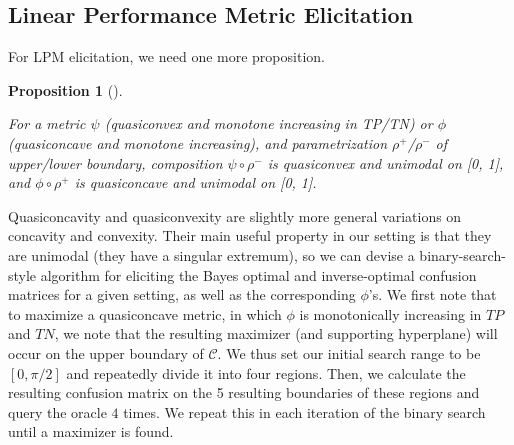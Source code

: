 \documentclass[
  letterpaper,
  numbers=noenddot,
  DIV=11]{scrreprt}
\theoremstyle{plain}
\newtheorem{proposition}{Proposition}[chapter]
\theoremstyle{definition}
\theoremstyle{remark}
\begin{document}
\subsection{Linear Performance Metric Elicitation}\label{sec-orgb6dac4e}

For LPM elicitation, we need one more proposition.

\begin{tcolorbox}[colframe=.grey, title=\faPenSquare \enspace Proposition]

\begin{proposition}[]\protect\hypertarget{prp-prp3.2}{}\label{prp-prp3.2}

For a metric \(\psi\) (quasiconvex and monotone increasing in TP/TN) or
\(\phi\) (quasiconcave and monotone increasing), and parametrization
\(\rho^+\)/\(\rho^-\) of upper/lower boundary, composition
\(\psi \circ \rho^-\) is quasiconvex and unimodal on {[}0, 1{]}, and
\(\phi \circ \rho^+\) is quasiconcave and unimodal on {[}0, 1{]}.

\end{proposition}

\end{tcolorbox}

Quasiconcavity and quasiconvexity are slightly more general variations
on concavity and convexity. Their main useful property in our setting is
that they are unimodal (they have a singular extremum), so we can devise
a binary-search-style algorithm for eliciting the Bayes optimal and
inverse-optimal confusion matrices for a given setting, as well as the
corresponding \(\phi\)'s. We first note that to maximize a quasiconcave
metric, in which \(\phi\) is monotonically increasing in \(TP\) and
\(TN\), we note that the resulting maximizer (and supporting hyperplane)
will occur on the upper boundary of \(\mathcal{C}\). We thus set our
initial search range to be \([0, \pi/2]\) and repeatedly divide it into
four regions. Then, we calculate the resulting confusion matrix on the 5
resulting boundaries of these regions and query the oracle \(4\) times.
We repeat this in each iteration of the binary search until a maximizer
is found.
\end{document}
